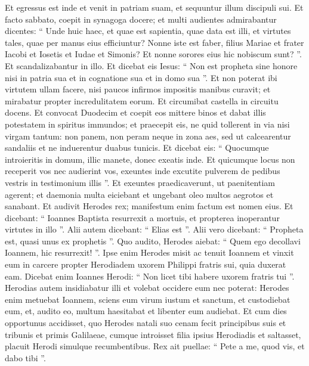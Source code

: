 \begin{biblechapter}
\begin{biblechapter}
\begin{biblechapter}
\begin{biblechapter}
\begin{biblechapter}
\begin{biblechapter}
\verse Et egressus est inde et venit in patriam suam, et sequuntur illum discipuli sui. 
\verse Et facto sabbato, coepit in synagoga docere; et multi audientes admirabantur dicentes: “ Unde huic haec, et quae est sapientia, quae data est illi, et virtutes tales, quae per manus eius efficiuntur? 
\verse Nonne iste est faber, filius Mariae et frater Iacobi et Iosetis et Iudae et Simonis? Et nonne sorores eius hic nobiscum sunt? ”. Et scandalizabantur in illo. 
\verse Et dicebat eis Iesus: “ Non est propheta sine honore nisi in patria sua et in cognatione sua et in domo sua ”. 
\verse Et non poterat ibi virtutem ullam facere, nisi paucos infirmos impositis manibus curavit; 
\verse et mirabatur propter incredulitatem eorum.
 Et circumibat castella in circuitu docens.
 \verse Et convocat Duodecim et coepit eos mittere binos et dabat illis potestatem in spiritus immundos; 
\verse et praecepit eis, ne quid tollerent in via nisi virgam tantum: non panem, non peram neque in zona aes, 
\verse sed ut calcearentur sandaliis et ne induerentur duabus tunicis. 
\verse Et dicebat eis: “ Quocumque introieritis in domum, illic manete, donec exeatis inde. 
\verse Et quicumque locus non receperit vos nec audierint vos, exeuntes inde excutite pulverem de pedibus vestris in testimonium illis ”. 
\verse Et exeuntes praedicaverunt, ut paenitentiam agerent; 
\verse et daemonia multa eiciebant et ungebant oleo multos aegrotos et sanabant.
 \verse Et audivit Herodes rex; manifestum enim factum est nomen eius. Et dicebant: “ Ioannes Baptista resurrexit a mortuis, et propterea inoperantur virtutes in illo ”. 
\verse Alii autem dicebant: “ Elias est ”. Alii vero dicebant: “ Propheta est, quasi unus ex prophetis ”. 
\verse Quo audito, Herodes aiebat: “ Quem ego decollavi Ioannem, hic resurrexit! ”.
 \verse Ipse enim Herodes misit ac tenuit Ioannem et vinxit eum in carcere propter Herodiadem uxorem Philippi fratris sui, quia duxerat eam. 
\verse Dicebat enim Ioannes Herodi: “ Non licet tibi habere uxorem fratris tui ”. 
\verse Herodias autem insidiabatur illi et volebat occidere eum nec poterat: 
\verse Herodes enim metuebat Ioannem, sciens eum virum iustum et sanctum, et custodiebat eum, et, audito eo, multum haesitabat et libenter eum audiebat. 
\verse Et cum dies opportunus accidisset, quo Herodes natali suo cenam fecit principibus suis et tribunis et primis Galilaeae, 
\verse cumque introisset filia ipsius Herodiadis et saltasset, placuit Herodi simulque recumbentibus. Rex ait puellae: “ Pete a me, quod vis, et dabo tibi ”. 

\end{biblechapter}
\end{biblechapter}
\end{biblechapter}
\end{biblechapter}
\end{biblechapter}
\end{biblechapter}
